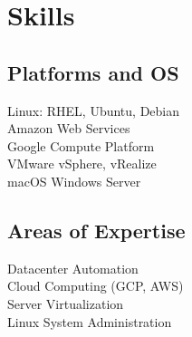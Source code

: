 \documentclass[]{deedy-resume-openfont}
\begin{document}
\begin{minipage}[t]{0.33\textwidth}
\section{Skills}


\subsection{Platforms and OS}
    Linux: RHEL, Ubuntu, Debian\\
    Amazon Web Services \\
    Google Compute Platform\\
    VMware vSphere, vRealize\\
    macOS \textbullet{} Windows Server\\
\sectionsep
    
\subsection{Areas of Expertise}
    Datacenter Automation\\
    Cloud Computing (GCP, AWS)\\
    Server Virtualization\\
    Linux System Administration\\
\end{minipage}
\end{document}
